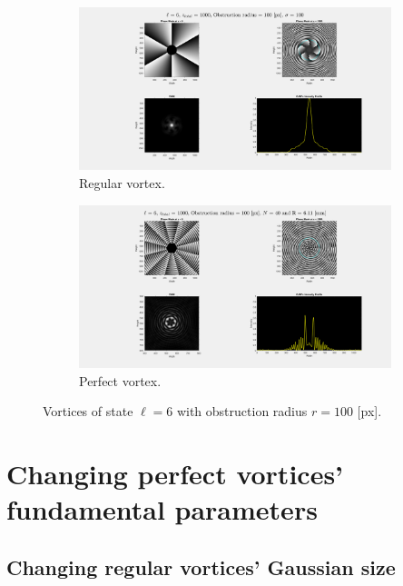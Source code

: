 \begin{figure}[htbp]
    \centering
    \begin{subfigure}[b]{0.45\textwidth}
        \centering
        \includegraphics[width=\textwidth]{images/Appendices/Additional_Results/Topological_Charge/reg_6_r100.png}
        \caption{Regular vortex.}
    \end{subfigure}
    \hfill
    \begin{subfigure}[b]{0.45\textwidth}
        \centering
        \includegraphics[width=\textwidth]{images/Appendices/Additional_Results/Topological_Charge/per_6_r100.png}
        \caption{Perfect vortex.}
    \end{subfigure}
    \caption{Vortices of state $\ell = 6$ with obstruction radius $r=100$ [px].}
    \label{fig:Vortices_L=6_r=100}
\end{figure}

\newpage
\section{Changing perfect vortices' fundamental parameters}
\subsection{Changing regular vortices' Gaussian size}

